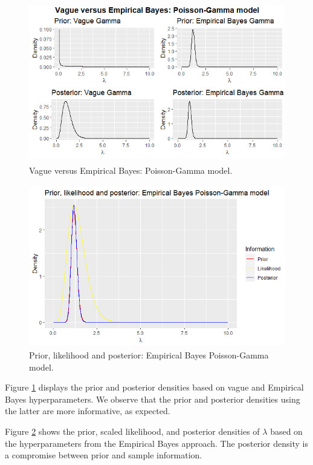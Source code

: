\begin{figure}[!h]
	\includegraphics[width=340pt, height=200pt]{Chapters/chapter1/figures/PoisGam.png}
	\caption[List of figure caption goes here]{Vague versus Empirical Bayes: Poisson-Gamma model.}\label{fig12}
\end{figure}

\begin{figure}[!h]
	\includegraphics[width=340pt, height=200pt]{Chapters/chapter1/figures/PriorLikPost.png}
	\caption[List of figure caption goes here]{Prior, likelihood and posterior: Empirical Bayes Poisson-Gamma model.}\label{fig13}
\end{figure}

Figure \ref{fig12} displays the prior and posterior densities based on vague and Empirical Bayes hyperparameters. We observe that the prior and posterior densities using the latter are more informative, as expected.

Figure \ref{fig13} shows the prior, scaled likelihood, and posterior densities of $\lambda$ based on the hyperparameters from the Empirical Bayes approach. The posterior density is a compromise between prior and sample information.

